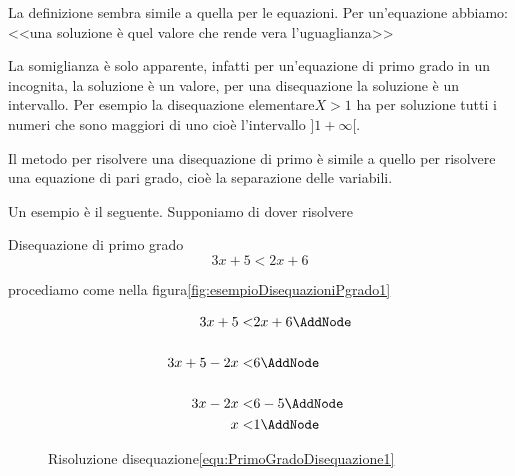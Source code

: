 La definizione sembra simile a quella per le equazioni. Per un'equazione abbiamo: <<una soluzione è quel valore che rende vera l'uguaglianza>>\par
La somiglianza è solo apparente, infatti per un'equazione di primo grado in un incognita, la soluzione è un valore, per una disequazione la soluzione è un intervallo. Per esempio la disequazione elementare$X>1$ ha per soluzione tutti i numeri che sono maggiori di uno cioè l'intervallo $]1 +\infty [$.\par
Il metodo per risolvere una disequazione di primo è simile a quello per risolvere una equazione di pari grado, cioè la separazione delle variabili.\par Un esempio è il seguente. Supponiamo di dover risolvere 
\begin{esempiot}{Disequazione di primo grado}{}
\begin{equation}
3x+5<2x+6\label{equ:PrimoGradoDisequazione1}
\end{equation}
\end{esempiot}
 procediamo come nella figura\nobs\vref{fig:esempioDisequazioniPgrado1}
\begin{figure}
	\begin{NodesList}
		\centering
		\begin{align*}
			3x+5<&2x+6\AddNode\\[.5cm] 
			3x+5-2x<&6\AddNode\\[.5cm] %
			3x-2x<&6-5\AddNode\\
			x<&1\AddNode
		\end{align*}
				\end{NodesList}
		\captionsetup{format=esempio,list=no}
	\caption{Risoluzione disequazione\nobs\vref{equ:PrimoGradoDisequazione1}}
	\label{fig:esempioDisequazioniPgrado1}
\end{figure}

